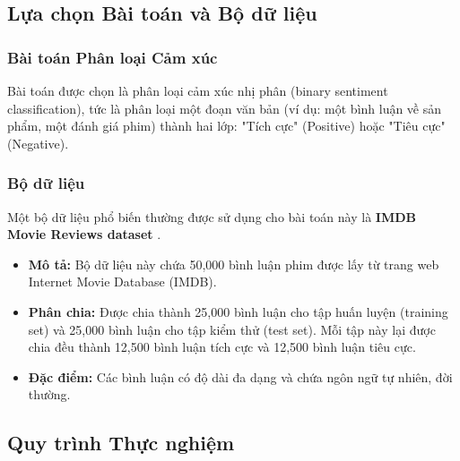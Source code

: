 \subsection{Lựa chọn Bài toán và Bộ dữ liệu}
\label{ssec:lua_chon_bai_toan_dataset}
\subsubsection{Bài toán Phân loại Cảm xúc}
Bài toán được chọn là phân loại cảm xúc nhị phân (binary sentiment classification), tức là phân loại một đoạn văn bản (ví dụ: một bình luận về sản phẩm, một đánh giá phim) thành hai lớp: "Tích cực" (Positive) hoặc "Tiêu cực" (Negative).

\subsubsection{Bộ dữ liệu}
Một bộ dữ liệu phổ biến thường được sử dụng cho bài toán này là \textbf{IMDB Movie Reviews dataset} \cite{maas2011learning}.
\begin{itemize}
    \item \textbf{Mô tả:} Bộ dữ liệu này chứa 50,000 bình luận phim được lấy từ trang web Internet Movie Database (IMDB).
    \item \textbf{Phân chia:} Được chia thành 25,000 bình luận cho tập huấn luyện (training set) và 25,000 bình luận cho tập kiểm thử (test set). Mỗi tập này lại được chia đều thành 12,500 bình luận tích cực và 12,500 bình luận tiêu cực.
    \item \textbf{Đặc điểm:} Các bình luận có độ dài đa dạng và chứa ngôn ngữ tự nhiên, đời thường.
\end{itemize}

\subsection{Quy trình Thực nghiệm}
\label{ssec:quy_trinh_thuc_nghiem_sa}

